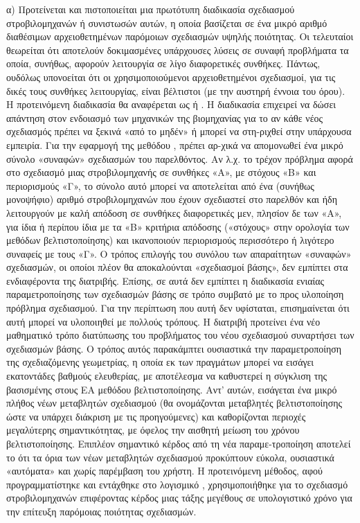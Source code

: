 	α) Προτείνεται και πιστοποιείται μια πρωτότυπη διαδικασία σχεδιασμού στροβιλομηχανών ή συνιστωσών αυτών, η οποία βασίζεται σε ένα μικρό αριθμό διαθέσιμων αρχειοθετημένων παρόμοιων σχεδιασμών υψηλής ποιότητας. Οι τελευταίοι θεωρείται ότι αποτελούν δοκιμασμένες υπάρχουσες λύσεις σε συναφή προβλήματα τα οποία, συνήθως, αφορούν λειτουργία σε λίγο διαφορετικές συνθήκες. Πάντως, ουδόλως υπονοείται ότι οι χρησιμοποιούμενοι αρχειοθετημένοι σχεδιασμοί, για τις δικές τους συνθήκες λειτουργίας, είναι βέλτιστοι (με την αυστηρή έννοια του όρου). Η προτεινόμενη διαδικασία θα αναφέρεται ως  ή . Η διαδικασία  επιχειρεί να δώσει απάντηση στον ενδοιασμό των μηχανικών της βιομηχανίας για το αν κάθε νέος σχεδιασμός πρέπει να ξεκινά «από το μηδέν» ή μπορεί να στη-ριχθεί στην υπάρχουσα εμπειρία. Για την εφαρμογή της μεθόδου , πρέπει αρ-χικά να απομονωθεί ένα μικρό σύνολο «συναφών» σχεδιασμών του παρελθόντος. Αν λ.χ. το τρέχον πρόβλημα αφορά στο σχεδιασμό μιας στροβιλομηχανής σε συνθήκες «Α», με στόχους «Β» και περιορισμούς «Γ», το σύνολο αυτό μπορεί να αποτελείται από ένα (συνήθως μονοψήφιο) αριθμό στροβιλομηχανών που έχουν σχεδιαστεί στο παρελθόν και ήδη λειτουργούν με καλή απόδοση σε συνθήκες διαφορετικές μεν, πλησίον δε των «Α», για ίδια ή περίπου ίδια με τα «Β» κριτήρια απόδοσης («στόχους» στην ορολογία των μεθόδων βελτιστοποίησης) και ικανοποιούν περιορισμούς περισσότερο ή λιγότερο συναφείς με τους «Γ». Ο τρόπος επιλογής του συνόλου των απαραίτητων «συναφών» σχεδιασμών, οι οποίοι πλέον θα αποκαλούνται «σχεδιασμοί βάσης»,  δεν εμπίπτει στα ενδιαφέροντα της διατριβής. Επίσης, σε αυτά δεν εμπίπτει η διαδικασία ενιαίας παραμετροποίησης των σχεδιασμών βάσης σε τρόπο συμβατό με το προς υλοποίηση πρόβλημα σχεδιασμού. Για την περίπτωση που αυτή δεν υφίσταται, επισημαίνεται ότι αυτή μπορεί να υλοποιηθεί με πολλούς τρόπους. Η διατριβή προτείνει ένα νέο μαθηματικό τρόπο διατύπωσης του προβλήματος του  νέου σχεδιασμού συναρτήσει των σχεδιασμών βάσης. Ο τρόπος αυτός παρακάμπτει ουσιαστικά την παραμετροποίηση της σχεδιαζόμενης γεωμετρίας, η οποία εκ των πραγμάτων μπορεί να εισάγει εκατοντάδες βαθμούς ελευθερίας, με αποτέλεσμα να καθυστερεί η σύγκλιση της βασισμένης στους ΕΑ μεθόδου βελτιστοποίησης. Αντ’ αυτών, εισάγεται ένα μικρό πλήθος νέων μεταβλητών σχεδιασμού (θα ονομάζονται μεταβλητές βελτιστοποίησης ώστε να υπάρχει διάκριση με τις προηγούμενες) και καθορίζονται περιοχές  μεγαλύτερης σημαντικότητας, με όφελος την αισθητή μείωση του χρόνου βελτιστοποίησης. Επιπλέον σημαντικό κέρδος από τη νέα παραμε-τροποίηση αποτελεί το ότι τα όρια των νέων μεταβλητών σχεδιασμού προκύπτουν εύκολα, ουσιαστικά «αυτόματα» και χωρίς παρέμβαση του χρήστη. Η προτεινόμενη μέθοδος, αφού προγραμματίστηκε και εντάχθηκε στο λογισμικό , χρησιμοποιήθηκε για το σχεδιασμό στροβιλομηχανών επιφέροντας κέρδος μιας τάξης μεγέθους σε υπολογιστικό χρόνο για την επίτευξη  παρόμοιας ποιότητας σχεδιασμών.       
               
